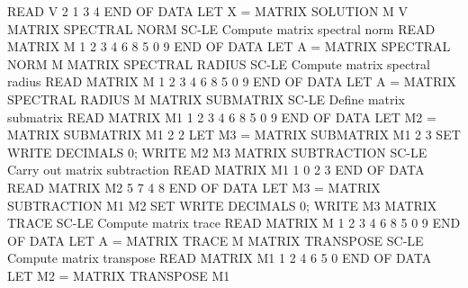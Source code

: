                                   READ V
                                  2
                                  1
                                  3
                                  4
                                  END OF DATA
                                  LET X = MATRIX SOLUTION M V
MATRIX SPECTRAL NORM        SC-LE Compute matrix spectral norm
                                  READ MATRIX M
                                  1 2 3
                                  4 6 8
                                  5 0 9
                                  END OF DATA
                                  LET A = MATRIX SPECTRAL NORM M
MATRIX SPECTRAL RADIUS      SC-LE Compute matrix spectral radius
                                  READ MATRIX M
                                  1 2 3
                                  4 6 8
                                  5 0 9
                                  END OF DATA
                                  LET A = MATRIX SPECTRAL RADIUS M
MATRIX SUBMATRIX            SC-LE Define matrix submatrix
                                  READ MATRIX M1
                                  1 2 3
                                  4 6 8
                                  5 0 9
                                  END OF DATA
                                  LET M2 = MATRIX SUBMATRIX M1 2 2
                                  LET M3 = MATRIX SUBMATRIX M1 2 3
                                  SET WRITE DECIMALS 0; WRITE M2 M3
MATRIX SUBTRACTION          SC-LE Carry out matrix subtraction
                                  READ MATRIX M1
                                  1 0
                                  2 3
                                  END OF DATA
                                  READ MATRIX M2
                                  5 7
                                  4 8
                                  END OF DATA
                                  LET M3 = MATRIX SUBTRACTION M1 M2
                                  SET WRITE DECIMALS 0; WRITE M3
MATRIX TRACE                SC-LE Compute matrix trace
                                  READ MATRIX M
                                  1 2 3
                                  4 6 8
                                  5 0 9
                                  END OF DATA
                                  LET A = MATRIX TRACE M
MATRIX TRANSPOSE            SC-LE Compute matrix transpose
                                  READ MATRIX M1
                                  1 2
                                  4 6
                                  5 0
                                  END OF DATA
                                  LET M2 = MATRIX TRANSPOSE M1
